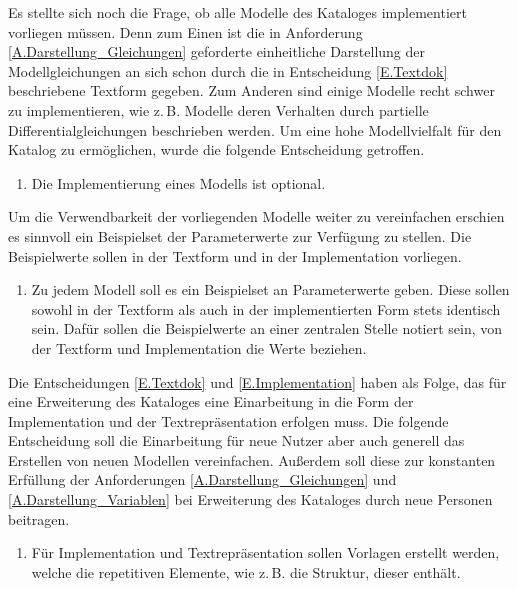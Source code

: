 Es stellte sich noch die Frage, ob alle Modelle des Kataloges implementiert vorliegen müssen. Denn zum Einen ist die in Anforderung \ref{A.Darstellung_Gleichungen} geforderte einheitliche Darstellung der Modellgleichungen an sich schon durch die in Entscheidung \ref{E.Textdok} beschriebene Textform gegeben. Zum Anderen sind einige Modelle recht schwer zu implementieren, wie z.\,B. Modelle deren Verhalten durch partielle Differentialgleichungen beschrieben werden. Um eine hohe Modellvielfalt für den Katalog zu ermöglichen, wurde die folgende Entscheidung getroffen.
\begin{enumerate}[resume*]
	\item \label{E.ImplementierungOptional}Die Implementierung eines Modells ist optional.
\end{enumerate}

Um die Verwendbarkeit der vorliegenden Modelle weiter zu vereinfachen erschien es sinnvoll ein Beispielset der Parameterwerte zur Verfügung zu stellen. Die Beispielwerte sollen in der Textform und in der Implementation vorliegen.
\begin{enumerate}[resume*]
	\item \label{E.Parameterwerte}Zu jedem Modell soll es ein Beispielset an Parameterwerte geben. Diese sollen sowohl in der Textform als auch in der implementierten Form stets identisch sein. Dafür sollen die Beispielwerte an einer zentralen Stelle notiert sein, von der Textform und Implementation die Werte beziehen.
\end{enumerate}

Die Entscheidungen \ref{E.Textdok} und \ref{E.Implementation} haben als Folge, das für eine Erweiterung des Kataloges eine Einarbeitung in die Form der Implementation und der Textrepräsentation erfolgen muss. Die folgende Entscheidung soll die Einarbeitung für neue Nutzer aber auch generell das Erstellen von neuen Modellen vereinfachen. Außerdem soll diese zur konstanten Erfüllung der Anforderungen \ref{A.Darstellung_Gleichungen} und \ref{A.Darstellung_Variablen} bei Erweiterung des Kataloges durch neue Personen beitragen.
\begin{enumerate}[resume*]
	\item \label{E.Vorlagen}Für Implementation und Textrepräsentation sollen Vorlagen erstellt werden, welche die repetitiven Elemente, wie z.\,B. die Struktur, dieser enthält. 
\end{enumerate}

